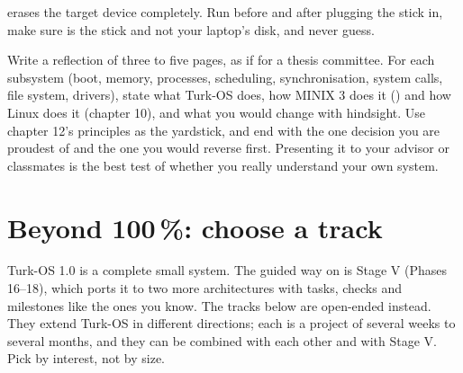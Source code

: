 \documentclass[11pt,a4paper]{article}
\begin{document}
\begin{warnbox}
 erases the target device completely. Run  before and
after plugging the stick in, make sure  is the stick and not your laptop's disk, and never guess.
\end{warnbox}

Write a reflection of three to five pages, as if for a thesis committee. For each subsystem (boot, memory, processes,
scheduling, synchronisation, system calls, file system, drivers), state what Turk-OS does, how MINIX 3 does it
(\OSDI) and how Linux does it (\MOS chapter 10), and what you would change with hindsight. Use \MOS chapter 12's
principles as the yardstick, and end with the one decision you are proudest of and the one you would reverse first.
Presenting it to your advisor or classmates is the best test of whether you really understand your own system.

\section{Beyond 100\,\%: choose a track}

Turk-OS 1.0 is a complete small system. The guided way on is Stage V (Phases 16--18), which ports it to two more
architectures with tasks, checks and milestones like the ones you know. The tracks below are open-ended instead. They
extend Turk-OS in different directions; each is a project of several weeks to several months, and they can be
combined with each other and with Stage V. Pick by interest, not by size.
\end{document}
